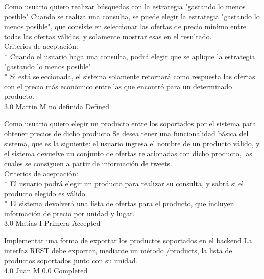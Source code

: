 	{Como usuario quiero realizar búsquedas con la estrategia "gastando lo menos posible"} %
	{Cuando se realiza una consulta, se puede elegir la estrategia "gastando lo
menos posible", que consiste en seleccionar las ofertas de precio mínimo entre
todas las ofertas válidas, y solamente mostrar esas en el resultado.
  \\
Criterios de aceptación:\\
* Cuando el usuario haga una consulta, podrá elegir que se aplique la estrategia "gastando lo menos posible"  \\
* Si está seleccionada, el sistema solamente retornará como respuesta las ofertas con el precio más económico entre las que encontró para un determinado producto.\\
} %
	{} %
	{3.0} %
	{Martin M} %
	{no definida} %
	{Defined} %


\vspace{20pt}

	{Como usuario quiero elegir un producto entre los soportados por el sistema para obtener precios de dicho producto} %
	{Se desea tener una funcionalidad básica del sistema, que es la siguiente: el
usuario ingresa el nombre de un producto válido, y el sistema devuelve un
conjunto de ofertas relacionadas con dicho producto, las cuales se consiguen a
partir de información de tweets.
  \\
Criterios de aceptación:\\
* El usuario podrá elegir un producto para realizar su consulta, y sabrá si el producto elegido es válido.  \\
* El sistema devolverá una lista de ofertas para el producto, que incluyen información de precio por unidad y lugar.\\
} %
	{} %
	{3.0} %
	{Matias I} %
	{Primera} %
	{Accepted} %

		{Implementar una forma de exportar los productos soportados en el backend} %
		{La interfaz REST debe exportar, mediante un método /products, la lista de
productos soportados junto con su unidad.\\
} %
		{4.0} %
		{Juan M} %
		{0.0} %
		{Completed} %


